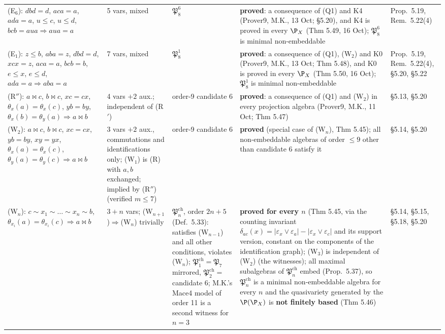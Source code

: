 \begin{table}[htbp]
\begin{tabular}{@{}llllp{4.2cm}@{}}
(E$_6$): $dbd=d$, $aca=a$, $ada=a$, $u\le c$, $u\le d$, $bcb=aua\Rightarrow aua=a$ & 5 vars, mixed & $\mathfrak P_8^6$ & \textbf{proved}: a consequence of (Q1) and K4 (Prover9, M.K., 13 Oct; \S5.20), and K4 is proved in every $\P_X$ (Thm 5.49, 16 Oct); $\mathfrak P_8^6$ is minimal non-embeddable & Prop.\ 5.19, Rem.\ 5.22(4) \\
(E$_1$): $z\le b$, $aba=z$, $dbd=d$, $xcx=z$, $aca=a$, $bcb=b$, $e\le x$, $e\le d$, $ada=a\Rightarrow aba=a$ & 7 vars, mixed & $\mathfrak P_8^1$ & \textbf{proved}: a consequence of (Q1), (W$_2$) and K0 (Prover9, M.K., 13 Oct; Thm 5.48), and K0 is proved in every $\P_X$ (Thm 5.50, 16 Oct); $\mathfrak P_8^1$ is minimal non-embeddable & Prop.\ 5.19, Rem.\ 5.22(4), \S5.20, \S5.22 \\
(R$''$): $a\bowtie c$, $b\bowtie c$, $xc=cx$, $\theta_x(a)=\theta_x(c)$, $yb=by$, $\theta_x(b)=\theta_y(a)\Rightarrow a\bowtie b$ & 4 vars $+2$ aux.; independent of (R$'$) & order-9 candidate 6 & \textbf{proved}: a consequence of (Q1) and (W$_2$) in every projection algebra (Prover9, M.K., 11 Oct; Thm 5.47) & \S5.13, \S5.20 \\
(W$_2$): $a\bowtie c$, $b\bowtie c$, $xc=cx$, $yb=by$, $xy=yx$, $\theta_x(a)=\theta_x(c)$, $\theta_y(a)=\theta_y(c)\Rightarrow a\bowtie b$ & 3 vars $+2$ aux., commutations and identifications only; (W$_1$) is (R) with $a,b$ exchanged; implied by (R$''$) (verified $m\le7$) & order-9 candidate 6 & \textbf{proved} (special case of (W$_n$), Thm 5.45); all non-embeddable algebras of order $\le9$ other than candidate 6 satisfy it & \S5.14, \S5.20 \\
(W$_n$): $c\sim x_1\sim\dots\sim x_n\sim b$, $\theta_{x_i}(a)=\theta_{x_i}(c)\Rightarrow a\bowtie b$ & $3+n$ vars; (W$_{n+1}$)$\Rightarrow$(W$_n$) trivially & $\mathfrak P^{\mathrm{ch}}_n$, order $2n+5$ (Def.\ 5.33): satisfies (W$_{n-1}$) and all other conditions, violates (W$_n$); $\mathfrak P^{\mathrm{ch}}_1=\mathfrak P_7$ mirrored, $\mathfrak P^{\mathrm{ch}}_2=$ candidate 6; M.K.'s Mace4 model of order 11 is a second witness for $n=3$ & \textbf{proved for every $n$} (Thm 5.45, via the counting invariant $\delta_{ac}(x)=|\varepsilon_x\vee\varepsilon_a|-|\varepsilon_x\vee\varepsilon_c|$ and its support version, constant on the components of the identification graph); (W$_3$) is independent of (W$_2$) (the witnesses); all maximal subalgebras of $\mathfrak P^{\mathrm{ch}}_n$ embed (Prop.\ 5.37), so $\mathfrak P^{\mathrm{ch}}_n$ is a minimal non-embeddable algebra for every $n$ and the quasivariety generated by the $\P(\P_X)$ is \textbf{not finitely based} (Thm 5.46) & \S5.14, \S5.15, \S5.18, \S5.20 \\

\end{tabular}
\end{table}
